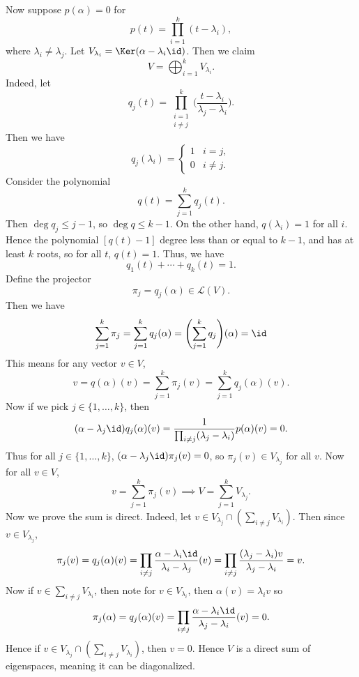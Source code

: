 \documentclass[12pt]{article}
\begin{document}
\begin{proofbox}
	Now suppose $p(\alpha) = 0$ for 
	\[
		p(t) = \prod_{i = 1}^{k}(t - \lambda_i)
	,\]
	where $\lambda_i \neq \lambda_j$. Let $V_{\lambda_i} = \Ker(\alpha - \lambda_i \id)$. Then we claim
	\[
	V = \bigoplus_{i = 1}^{k} V_{\lambda_i}
	.\]
	Indeed, let
	\[
		q_j(t) = \prod_{\substack{i = 1 \\i \neq j}}^{k} \biggl( \frac{t - \lambda_i}{\lambda_j- \lambda_i} \biggr)
	.\]
	Then we have
	\[
		q_j(\lambda_i) =
		\begin{cases}
			1 & i = j, \\
			0 & i \neq j.
		\end{cases}
	\]
	Consider the polynomial
	\[
		q(t) = \sum_{j = 1}^{k} q_j(t)
	.\]
	Then $\deg q_j \leq j-1$, so $\deg q \leq k-1$. On the other hand, $q(\lambda_i) = 1$ for all $i$. Hence the polynomial $[q(t) - 1]$ degree less than or equal to $k-1$, and has at least $k$ roots, so for all $t$, $q(t) = 1$. Thus, we have
	\[
		q_1(t) + \cdots + q_k(t) = 1
	.\]
	Define the projector
	\[
		\pi_j = q_j(\alpha) \in \mathcal{L}(V)
	.\]
	Then we have
	\begin{align*}
		\sum_{j = 1}^{k} \pi_j = \sum_{j = 1}^{k} q_j(\alpha) = \Biggl( \sum_{j = 1}^{k} q_j \Biggr) (\alpha) = \id
	\end{align*}
	This means for any vector $v \in V$,
	\[
		v = q(\alpha)(v) = \sum_{j = 1}^{k} \pi_j(v) = \sum_{j = 1}^{k} q_j(\alpha)(v)
	.\]
	Now if we pick $j \in \{1, \ldots, k\}$, then
	 \[
		 (\alpha - \lambda_j \id) q_j(\alpha)(v) = \frac{1}{\prod_{i \neq j}(\lambda_j - \lambda_i)} p(\alpha)(v) = 0
	.\]
	Thus for all $j \in \{1, \ldots, k\}$, $(\alpha - \lambda_j \id)\pi_j(v) = 0$, so $\pi_j(v) \in V_{\lambda_j}$ for all $v$. Now for all $v \in V$,
	\[
		v = \sum_{j = 1}^{k} \pi_j(v) \implies V = \sum_{j = 1}^{k}V_{\lambda_j}.
	\]
	Now we prove the sum is direct. Indeed, let $v \in V_{\lambda_j} \cap (\sum_{i \neq j} V_{\lambda_i})$. Then since $v \in V_{\lambda_j}$,
	\[
		\pi_j(v) = q_j(\alpha)(v) = \prod_{i \neq j} \frac{\alpha - \lambda_i \id}{\lambda_i - \lambda_j} (v) = \prod_{i \neq j} \frac{(\lambda_j - \lambda_i)v}{\lambda_j - \lambda_i} = v
	.\]
	Now if $v \in \sum_{i \neq j} V_{\lambda_i}$, then note for $v \in V_{\lambda_i}$, then $\alpha(v) = \lambda_i v$ so
	\[
		\pi_j(\alpha) = q_j(\alpha)(v) = \prod_{i \neq j} \frac{\alpha - \lambda_i \id}{\lambda_j - \lambda_i}(v) = 0
	.\]
	Hence if $v \in V_{\lambda_j}\cap (\sum_{i \neq j} V_{\lambda_i})$, then $v = 0$. Hence $V$ is a direct sum of eigenspaces, meaning it can be diagonalized.
\end{proofbox}
\end{document}
